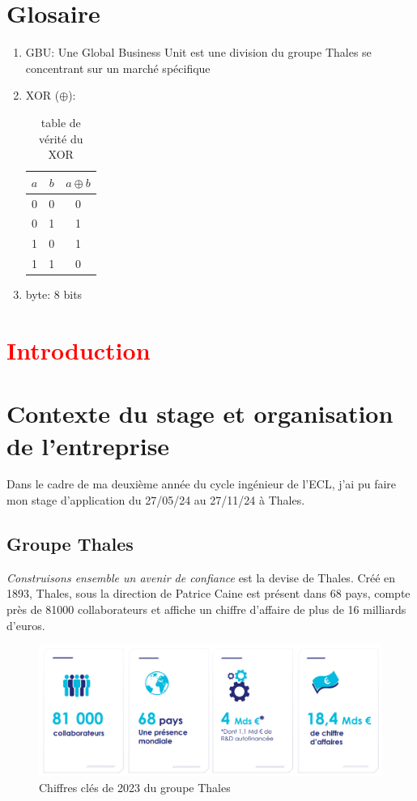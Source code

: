\documentclass[a4paper, 12pt]{article}
\begin{document}
\section*{Glosaire}
\begin{enumerate}
	\item GBU\label{GBU}: Une Global Business Unit est une division du groupe Thales se concentrant sur un marché spécifique
	\item XOR\label{XOR} ($\oplus$):\\
		
		\begin{table}[h]
		\center
		\begin{tabular}{|c|c|c|}
		\hline
			$a$ & $b$ & $a\oplus b$ \\ \hline\hline
			0 & 0 & 0 \\ \hline
			0 & 1 & 1 \\ \hline
			1 & 0 & 1 \\ \hline
			1 & 1 & 0 \\ \hline
		\end{tabular}
		\caption{table de vérité du XOR}
		\label{XOR_table}
		\end{table}

	\item byte\label{byte}: 8 bits	
\end{enumerate}
\newpage

\section{\textcolor{red}{Introduction}}

\section{Contexte du stage et organisation de l'entreprise}
Dans le cadre de ma deuxième année du cycle ingénieur de l'ECL, j'ai pu faire mon stage d'application du 27/05/24 au 27/11/24 à Thales.
\subsection{Groupe Thales}
\og{}\emph{Construisons ensemble un avenir de confiance}\fg{} est la devise de Thales. Créé en 1893, Thales, sous la direction de Patrice Caine est présent dans 68 pays, compte près de 81000 collaborateurs et affiche un chiffre d'affaire de plus de 16 milliards d'euros. \\

\begin{figure}[h]
	\centering
	\includegraphics[width=\textwidth]{img/thales_pres.png}
	\caption{Chiffres clés de 2023 du groupe Thales}
	\label{chiffres2023}
\end{figure}
\end{document}
